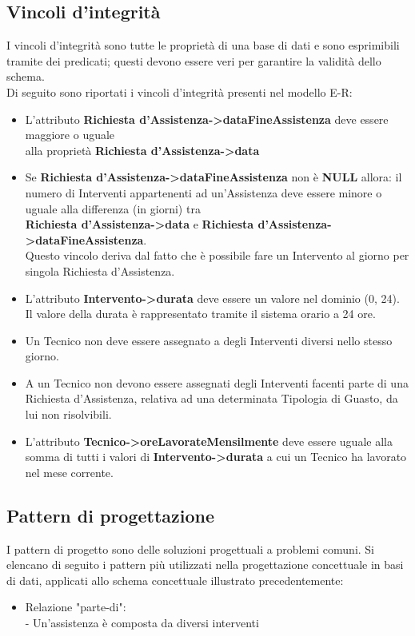 \documentclass[legalpaper]{article}
\begin{document}
\subsection{Vincoli d'integrità}
I vincoli d'integrità sono tutte le proprietà di una base di dati e sono esprimibili 
tramite dei predicati; questi devono essere veri per garantire la validità dello schema.\\
\newline
Di seguito sono riportati i vincoli d'integrità presenti nel modello E-R:
\begin{itemize}
	\item L'attributo  \textbf{Richiesta d'Assistenza->dataFineAssistenza} deve essere maggiore o uguale\\
	alla proprietà \textbf{Richiesta d'Assistenza->data}
	\item Se   \textbf{Richiesta d'Assistenza->dataFineAssistenza} non è \textbf{NULL} allora: il numero di Interventi appartenenti ad un'Assistenza deve essere minore o uguale alla differenza (in giorni) tra \\  \textbf{Richiesta d'Assistenza->data} e   \textbf{Richiesta d'Assistenza->dataFineAssistenza}.\\Questo vincolo deriva dal fatto che è possibile fare un Intervento al giorno per singola Richiesta d'Assistenza.
	\item L'attributo  \textbf{Intervento->durata} deve essere un valore nel dominio (0, 24).
	Il valore della durata è rappresentato tramite il sistema orario a 24 ore.
	\item Un Tecnico non deve essere assegnato a degli Interventi diversi nello stesso giorno.
	\item A un Tecnico non devono essere assegnati degli Interventi facenti parte di una Richiesta d'Assistenza, relativa ad una determinata Tipologia di Guasto, da lui non risolvibili.
	\item L'attributo  \textbf{Tecnico->oreLavorateMensilmente} deve essere uguale alla somma di tutti i valori di  \textbf{Intervento->durata} a cui un Tecnico ha lavorato nel mese corrente.

	
\end{itemize}

\subsection{Pattern di progettazione}
I pattern di progetto sono delle soluzioni progettuali a problemi comuni. Si elencano di seguito i pattern più utilizzati nella progettazione concettuale in basi di dati, applicati allo schema concettuale illustrato precedentemente:
\begin{itemize}
	\item Relazione "parte-di":\\
	- Un'assistenza è composta da diversi interventi

\end{itemize}
	
\end{document}
